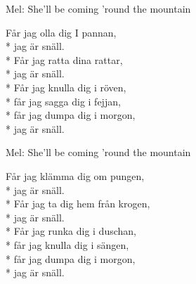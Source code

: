\begin{SongText}
    \begin{SongInfo}
        Mel: She’ll be coming ’round the mountain
    \end{SongInfo}
    \begin{SongVerse}
        Får jag olla dig I pannan,\\*%
        jag är snäll.\\*%
        Får jag ratta dina rattar,\\*%
        jag är snäll.\\*%
        Får jag knulla dig i röven,\\*%
        får jag sagga dig i fejjan,\\*%
        får jag dumpa dig i morgon,\\*%
        jag är snäll.
    \end{SongVerse}
\end{SongText}
\begin{SongText}
    \begin{SongInfo}
        Mel: She’ll be coming ’round the mountain
    \end{SongInfo}
    \begin{SongVerse}
        Får jag klämma dig om pungen,\\*%
        jag är snäll.\\*%
        Får jag ta dig hem från krogen,\\*%
        jag är snäll.\\*%
        Får jag runka dig i duschan,\\*%
        får jag knulla dig i sängen,\\*%
        får jag dumpa dig i morgon,\\*%
        jag är snäll.
    \end{SongVerse}
\end{SongText}
